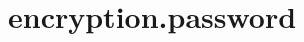 \section{encryption.password}
\label{configuration:EncryptionPassword}
\AvailableInCsharpOnly{\TODO}